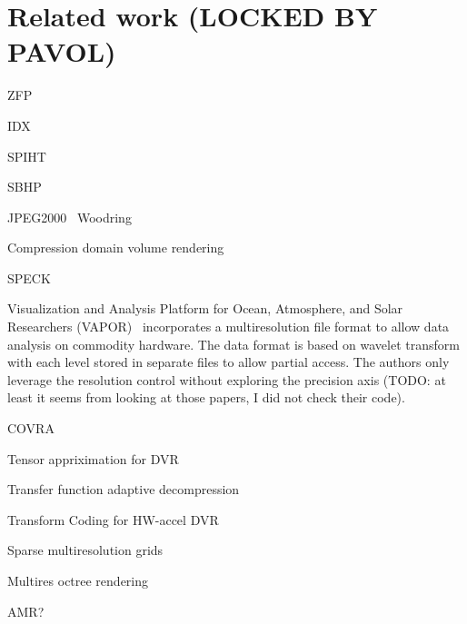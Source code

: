 \section{Related work (LOCKED BY PAVOL)}
ZFP~\cite{zfp2014}

IDX~\cite{idx2001}

SPIHT~\cite{spiht1996}


SBHP~\cite{sbhp2000}

JPEG2000~\cite{jpeg2001}
Woodring~\cite{woodring2011}

Compression domain volume rendering~\cite{compression_domain2003}

SPECK~\cite{speck2004}

Visualization and Analysis Platform for Ocean, Atmosphere, and Solar Researchers
(VAPOR)~\cite{multires_toolkit2003, vapor2007} incorporates a multiresolution file
format to allow data analysis on commodity hardware. The data format is based on
wavelet transform with each level stored in separate files to allow partial access.
The authors only leverage the resolution control without exploring the precision axis
(TODO: at least it seems from looking at those papers, I did not check their code).


COVRA~\cite{covra2012}

Tensor appriximation for DVR~\cite{tensor_dvr2015}

Transfer function adaptive decompression~\cite{tf_decompression2004}

Transform Coding for HW-accel DVR~\cite{hw_dvr2007}


Sparse multiresolution grids~\cite{vdb2013,spgrid2014}

Multires octree rendering~\cite{multires_octree1999}

AMR?
